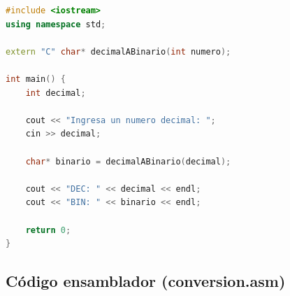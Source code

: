 \documentclass[12pt, letterpaper]{article}
\begin{document}
\begin{lstlisting}[language=C++, caption={main.cpp --- Interfaz con el usuario}]
#include <iostream>
using namespace std;

extern "C" char* decimalABinario(int numero);

int main() {
    int decimal;

    cout << "Ingresa un numero decimal: ";
    cin >> decimal;

    char* binario = decimalABinario(decimal);

    cout << "DEC: " << decimal << endl;
    cout << "BIN: " << binario << endl;

    return 0;
}
\end{lstlisting}

\subsection{Código ensamblador (conversion.asm)}
\end{document}
